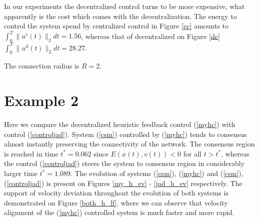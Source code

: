 \documentclass[a4paper,10pt, english]{article}
\begin{document}
In our experiments the decentralized control turns to be more expensive, what apparently is the cost which comes with the decentralization. 
The energy to control the system spend by centralized control in Figure \ref{cc} amounts to  $\int_{0}^{T} \|u^c(t)\|_2 dt  = 1.56$, whereas that of decentralized on Figure \ref{dc} $\int_{0}^{T} \|u^d(t)\|_2 dt  = 28.27$.


 The connection radius is $R = 2$. 

 \section{Example 2}
  Here we compare the decentralized heuristic feedback control (\ref{myhc}) with control (\ref{controljad}).
System (\ref{csm}) controlled by (\ref{myhc}) tends to consensus almost instantly preserving the connectivity of the network. The consensus region is reached 
  in time   $t^* = 0.062$ since  $E(x(t), v(t)) < 0$ for all $t>t^{*}$, whereas the control (\ref{controljad}) steers the system to consensus region in considerably larger time  $t^* = 1.089$.
  The evolution of systems (\ref{csm}), (\ref{myhc}) and (\ref{csm}), (\ref{controljad}) is present on Figures \ref{my_h_ev} - \ref{jad_h_ev} respectively.
  The support of velocity deviation throughout the evolution of both systems is demonstrated on Figure \ref{both_h_lf}, where we can observe that velocity alignment of the (\ref{myhc}) controlled system is much faster and more rapid.
\end{document}
